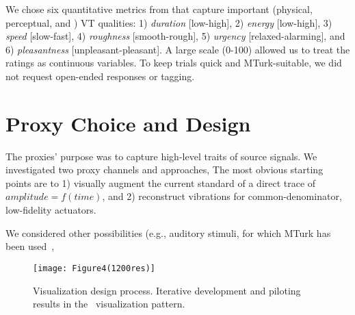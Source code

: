 We chose six quantitative metrics from \cite{Seifi2015} that capture important  (physical, perceptual, and %
) VT qualities:
 1) \textit{duration} [low-high], 
 2) \textit{energy} [low-high], 
 3) \textit{speed} [slow-fast], 
 4) \textit{roughness} [smooth-rough], 
 5) \textit{urgency} [relaxed-alarming], and 
 6) \textit{pleasantness} [unpleasant-pleasant].
A large scale (0-100) 
allowed us to treat the ratings as continuous variables.
To keep trials quick and MTurk-suitable,
we did not request open-ended responses or tagging. %

\section{Proxy Choice and Design}
The proxies' purpose was to capture high-level traits of source signals. 
We investigated two proxy channels and approaches,  %
The most obvious starting points are to 
1) visually augment the current standard of a direct trace of $amplitude=f(time)$, and
2) reconstruct vibrations for common-denominator, low-fidelity actuators.

We considered other possibilities (e.g., auditory stimuli, for which MTurk  has been used~\cite{Cartwright2015},   





    \begin{figure*}
        \centering
        \texttt{[image: Figure4(1200res)]}
        \caption{Visualization design process. Iterative development and piloting results in the \linear~visualization pattern.}
        \label{fig:vis:initialdesigns}
    \end{figure*}
    
